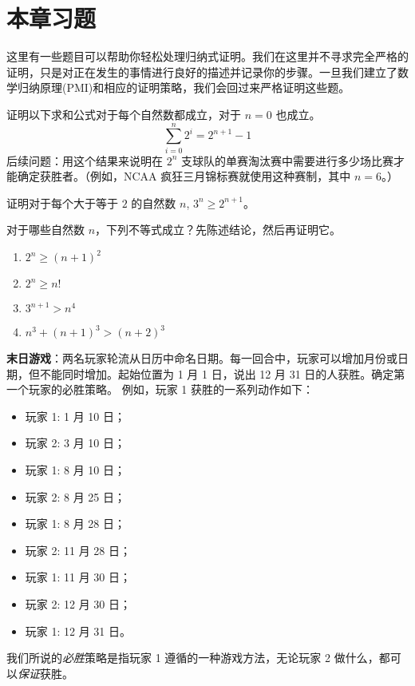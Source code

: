 \section{本章习题}

这里有一些题目可以帮助你轻松处理归纳式证明。我们在这里并不寻求完全严格的证明，只是对正在发生的事情进行良好的描述并记录你的步骤。一旦我们建立了数学归纳原理(PMI)和相应的证明策略，我们会回过来严格证明这些题。

\begin{exercise}
    证明以下求和公式对于每个自然数都成立，对于 $n=0$ 也成立。
    \[\sum_{i=0}^{n}2^i=2^{n+1}-1\]
    后续问题：用这个结果来说明在 $2^n$ 支球队的单赛淘汰赛中需要进行多少场比赛才能确定获胜者。（例如，NCAA 疯狂三月锦标赛就使用这种赛制，其中 $n = 6$。）
\end{exercise}

\begin{exercise}
    证明对于每个大于等于 $2$ 的自然数 $n$, $3^n \ge 2^{n+1}$。
\end{exercise}

\begin{exercise}
    对于哪些自然数 $n$，下列不等式成立？先陈述结论，然后再证明它。
    \begin{enumerate}
        \item $2^n \ge (n + 1)^2$
        \item $2^n \ge n!$
        \item $3^{n+1} > n^4$
        \item $n^3 + (n + 1)^3 > (n + 2)^3$
    \end{enumerate}
\end{exercise}

\begin{exercise}
    \textbf{末日游戏}：两名玩家轮流从日历中命名日期。每一回合中，玩家可以增加月份或日期，但不能同时增加。起始位置为 1 月 1 日，说出 12 月 31 日的人获胜。确定第一个玩家的必胜策略。
    例如，玩家 1 获胜的一系列动作如下：
    \begin{itemize}
        \item 玩家 1: 1 月 10 日；
        \item 玩家 2: 3 月 10 日；
        \item 玩家 1: 8 月 10 日；
        \item 玩家 2: 8 月 25 日；
        \item 玩家 1: 8 月 28 日；
        \item 玩家 2: 11 月 28 日；
        \item 玩家 1: 11 月 30 日；
        \item 玩家 2: 12 月 30 日；
        \item 玩家 1: 12 月 31 日。
    \end{itemize}
    我们所说的\textit{必胜}策略是指玩家 1 遵循的一种游戏方法，无论玩家 2 做什么，都可以\textit{保证}获胜。
\end{exercise}

